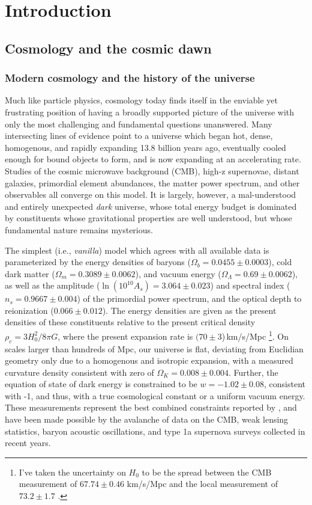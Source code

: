 \chapter{Introduction}


\section{Cosmology and the cosmic dawn}

\subsection{Modern cosmology and the history of the universe}

Much like particle physics, cosmology today finds itself in the enviable yet frustrating position of having a broadly supported picture of the universe with only the most challenging and fundamental questions unanswered. Many intersecting lines of evidence point to a universe which began hot, dense, homogenous, and rapidly expanding 13.8 billion years ago, eventually cooled enough for bound objects to form, and is now expanding at an accelerating rate. Studies of the cosmic microwave background (CMB), high-z supernovae, distant galaxies, primordial element abundances, the matter power spectrum, and other observables all converge on this model. It is largely, however, a mal-understood and entirely unexpected \textit{dark} universe, whose total energy budget is dominated by constituents whose gravitational properties are well understood, but whose fundamental nature remains mysterious. 

The simplest (i.e., \textit{vanilla}) model which agrees with all available data is parameterized by the energy densities of baryons ($\Omega_b=0.0455\pm0.0003$), cold dark matter  ($\Omega_m=0.3089\pm0.0062$), and vacuum energy ($\Omega_\Lambda=0.69\pm0.0062$), as well as the amplitude ($\ln (10^{10}A_s)=3.064\pm0.023$) and spectral index ($n_s=0.9667\pm0.004$) of the primordial power spectrum, and the optical depth to reionization ($0.066\pm0.012$). 
The energy densities are given as the present densities of these constituents relative to the present critical density $\rho_c=3H_0^2/8\pi G$, where the present expansion rate is $(70\pm3$)\,km/s/Mpc
\footnote{I've taken the uncertainty on $H_0$ to be the spread between the CMB measurement of $67.74\pm0.46$ km/s/Mpc \citep{planck16} and the local measurement of $73.2\pm1.7$ \citep{reiss16}.}. 
On scales larger than hundreds of Mpc, our universe is flat, deviating from Euclidian geometry only due to a homogenous and isotropic expansion, with a measured curvature density consistent with zero of $\Omega_K=0.008\pm0.004$. 
Further, the equation of state of dark energy is constrained to be $w=-1.02\pm0.08$, consistent with -1, and thus, with a true cosmological constant or a uniform vacuum energy. These measurements represent the best combined constraints reported by \citet{planck16}, and have been made possible by the avalanche of data on the CMB, weak lensing statistics, baryon acoustic oscillations, and type 1a supernova surveys collected in recent years. 

